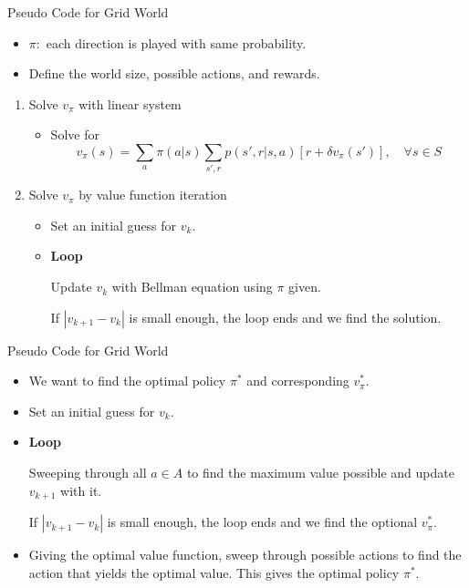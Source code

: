 \documentclass{beamer}
\begin{document}
\begin{frame}{Pseudo Code for Grid World}
    \begin{itemize}
        \item $\pi:$ each direction is played with same probability.
        \item Define the world size, possible actions, and rewards.
    \end{itemize}
    \begin{enumerate}
        \item Solve $v_\pi$ with linear system
            \begin{itemize}
                \item Solve for 
                \[
                v_\pi(s) = \sum_a \pi(a|s) \sum_{s',r}p(s',r|s,a)[r+\delta v_\pi(s')],\quad \forall s\in S
                \]
            \end{itemize}

        \item Solve $v_\pi$ by value function iteration
            \begin{itemize}
                \item Set an initial guess for $v_k$.
                \item \textbf{Loop} 
                
                Update $v_k$ with Bellman equation using $\pi$ given.

                If $|v_{k+1}-v_k|$ is small enough, the loop ends and we find the solution.
            \end{itemize}
    \end{enumerate}
\end{frame}

\begin{frame}{Pseudo Code for Grid World}
    \begin{itemize}
        \item We want to find the optimal policy $\pi^*$ and corresponding $v_\pi^*$.
        \item Set an initial guess for $v_k$.
        \item \textbf{Loop}

        Sweeping through all $a\in A$ to find the maximum value possible and update $v_{k+1}$ with it.

        If $|v_{k+1}-v_k|$ is small enough, the loop ends and we find the optional $v_\pi^*$.

        \item Giving the optimal value function, sweep through possible actions to find the action that yields the optimal value. This gives the optimal policy $\pi^*$. 
    \end{itemize}
\end{frame}
\end{document}
